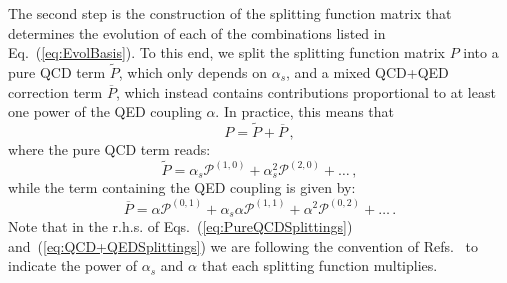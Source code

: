 The second step is the construction of the splitting function matrix that
determines the evolution of each of the combinations listed in
Eq.~(\ref{eq:EvolBasis}).
%
To this end, we split the splitting function matrix $P$ into a pure
QCD term $\widetilde{P}$, which only depends on $\alpha_s$, and a
mixed QCD+QED correction term $\overline{P}$, which instead contains
contributions proportional to at least one power of the QED coupling
$\alpha$.
%
In practice, this means that
\begin{equation}
P = \widetilde{P} + \overline{P}\,,
\end{equation}
where the pure QCD term reads:
\begin{equation}\label{eq:PureQCDSplittings}
\widetilde{P} = \alpha_s \mathcal{P}^{(1,0)} + \alpha_s^2 \mathcal{P}^{(2,0)}+\dots\, ,
\end{equation}
while the term containing the QED coupling is given by:
\begin{equation}\label{eq:QCD+QEDSplittings}
\overline{P} = \alpha \mathcal{P}^{(0,1)} + \alpha_s\alpha \mathcal{P}^{(1,1)}+\alpha^2 \mathcal{P}^{(0,2)} + \dots \, .
\end{equation}
Note that in the r.h.s. of Eqs.~(\ref{eq:PureQCDSplittings})
and~(\ref{eq:QCD+QEDSplittings}) we are following the convention of
Refs.~\cite{deFlorian:2015ujt,deFlorian:2016gvk} to indicate the power
of $\alpha_s$ and $\alpha$ that each splitting function multiplies.

